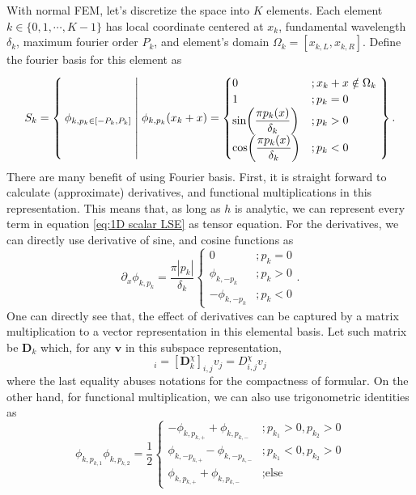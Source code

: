 \documentclass[preprint, 12pt]{revtex4-2}
\numberwithin{equation}{section}
\begin{document}
With normal FEM, let's discretize the space into $K$ elements. Each element $k\in\{0, 1, \cdots, K-1\}$ has local coordinate centered at $x_k$, fundamental wavelength $\delta_k$, maximum fourier order $P_k$, and element's domain $\Omega_k=[x_{k,L}, x_{k, R}]$. Define the fourier basis for this element as
\begin{equation}
    S_k = \Set{\phi_{k,p_k\in[-P_k, P_k]}|\phi_{k,p_k}(x_k+x)=
                \begin{cases}
                    0 &; x_k + x \notin \Omega_k \\
                    1 &; p_k = 0\\
                    \sin(\dfrac{\pi p_k (x)}{\delta_k}) &; p_k > 0\\
                    \cos(\dfrac{\pi p_k (x)}{\delta_k}) &; p_k < 0
                \end{cases}
    }.
\end{equation}
There are many benefit of using Fourier basis. First, it is straight forward to calculate (approximate) derivatives, and functional multiplications in this representation. This means that, as long as $h$ is analytic, we can represent every term in equation \ref{eq:1D scalar LSE} as tensor equation. For the derivatives, we can directly use derivative of sine, and cosine functions as
\begin{equation}
    \partial_x\phi_{k,p_k} = \dfrac{\pi |p_k|}{\delta_k}
                                \begin{cases}
                                    0 &; p_k = 0 \\
                                    \phi_{k,-p_k} &; p_k > 0 \\
                                   -\phi_{k,-p_k} &; p_k < 0
                                \end{cases}.
\end{equation}
One can directly see that, the effect of derivatives can be captured by a matrix multiplication to a vector representation in this elemental basis. Let such matrix be $\mathbf{D}_k$ which, for any $\mathbf{v}$ in this subspace representation,
\begin{equation}
    [\partial_x^\chi \mathbf{v}]_i = [\mathbf{D}^\chi_{k}]_{i,j}v_j=D^\chi_{i, j}v_j
\end{equation}
where the last equality abuses notations for the compactness of formular. On the other hand, for functional multiplication, we can also use trigonometric identities as
\begin{equation}
    \phi_{k,p_{k,1}}\phi_{k,p_{k,2}} = \dfrac{1}{2}
        \begin{cases}
            -\phi_{k,p_{k,+}} + \phi_{k,p_{k,-}}  &; p_{k_1} > 0, p_{k_2} > 0 \\
            \phi_{k,-p_{k,+}} - \phi_{k,-p_{k,-}} &; p_{k_1} < 0, p_{k_2} > 0 \\
            \phi_{k,p_{k,+}} + \phi_{k,p_{k,-}}   &; \text{else}
        \end{cases}
\end{equation}
\end{document}
